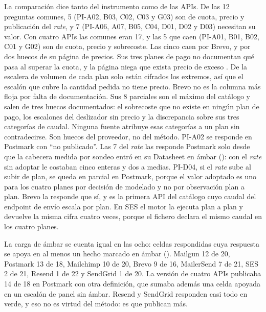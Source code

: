 La comparación dice tanto del instrumento como de las APIs. De las 12 preguntas comunes,
5 (PI-A02, B03, C02, C03 y G03) son de cuota, precio y publicación del \textit{rate}, y
7 (PI-A06, A07, B05, C04, D01, D02 y D03) necesitan su valor. Con cuatro APIs las
comunes eran 17, y las 5 que caen (PI-A01, B01, B02, C01 y G02) son de cuota, precio y
sobrecoste. Las cinco caen por Brevo, y por dos huecos de su página de precios. Sus tres planes de
pago no documentan qué pasa al superar la cuota, y la página niega que exista precio
de exceso \citep{brevopricing}. De la escalera de volumen de cada plan solo están
cifrados los extremos, así que el escalón que cubre la cantidad pedida no tiene precio.
Brevo no es la columna más floja por falta de documentación. Sus 8 parciales son el
máximo del catálogo y salen de tres huecos documentados: el sobrecoste que no existe en
ningún plan de pago, los escalones del deslizador sin precio y la discrepancia sobre sus
tres categorías de caudal. Ninguna fuente atribuye esas categorías a un plan sin
contradecirse. Son huecos del proveedor, no del método.
PI-A02 se responde en Postmark con ``no publicado''. Las 7 del \textit{rate} las
responde Postmark solo desde que la cabecera medida por sondeo entró en su Datasheet en
ámbar (\semambar{}): con el \textit{rate} sin adoptar le costaban cinco enteras y dos a
medias. PI-D04, si el \textit{rate} sube al subir de plan, se queda en parcial en
Postmark, porque el valor adoptado es uno para los cuatro planes por decisión de
modelado y no por observación plan a plan. Brevo la responde que sí, y es la primera API
del catálogo cuyo caudal del endpoint de envío escala por plan. En SES el motor la
ejecuta plan a plan y devuelve la misma cifra cuatro veces, porque el fichero declara el
mismo caudal en los cuatro planes.

La carga de ámbar se cuenta igual en las ocho: celdas respondidas cuya respuesta se
apoya en al menos un hecho marcado en ámbar (\semambar{}). Mailgun 12 de 20, Postmark 13
de 18, Mailchimp 10 de 20, Brevo 9 de 16, MailerSend 7 de 21, SES 2 de 21, Resend 1 de
22 y SendGrid 1 de 20. La versión de cuatro APIs publicaba 14 de 18 en Postmark con otra
definición, que sumaba además una celda apoyada en un escalón de panel sin ámbar. Resend
y SendGrid responden casi todo en verde, y eso no es virtud del método: es que publican
más.

